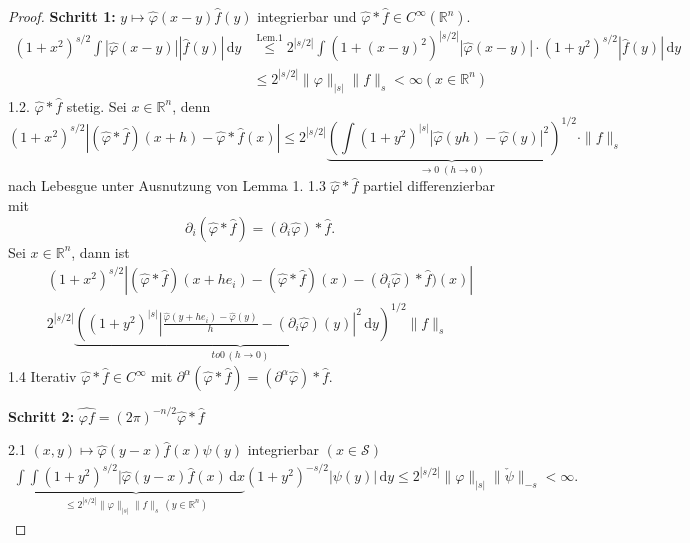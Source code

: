 \documentclass[
paper=a4,
bibtotocnumbered,
liststotocnumbered,
tablecaptionabove,
pointlessnumbers,
twoside,
openright,
10pt
]
{report}
\let\phi\varphi
\theoremstyle{definition}
\numberwithin{equation}{chapter}
\begin{document}
\begin{proof}
\textbf{Schritt 1:} $y\mapsto \hat \phi(x-y) \hat f(y)$ integrierbar und $\hat \phi * \hat f \in C^\infty(\mathbb R^n)$.
\begin{align}
(1+x^2)^{s/2} \int |\hat \phi(x-y)| |\hat f(y)|\, \mathrm dy & \stackrel{\text{Lem.} 1}\le 2^{|s/2|} \int (1+(x-y)^2)^{|s/2|} |\hat \phi(x-y)|\cdot (1+y^2)^{s/2} |\hat f(y)|\, \mathrm dy\\
&\le 2^{|s/2|} \| \phi\|_{|s|} \|f\|_s <\infty (x\in \mathbb R^n)\label{eq:5.1}
\end{align}
1.2. $\hat \phi * \hat f$ stetig. Sei $x\in \mathbb R^n$, denn 
\begin{equation}
(1+x^2)^{s/2} |(\hat \phi * \hat f) (x+h) - \hat \phi * \hat f(x) | \le 2^{|s/2|} \underbrace{\left ( \int (1+y^2)^{|s|} |\hat \phi(yh) - \hat \phi(y)|^2 \right )^{1/2}}_{\to 0\; (h\to 0)} \cdot \| f\|_s
\end{equation}
nach Lebesgue unter Ausnutzung von Lemma 1. %
1.3 $\hat \phi*\hat f$ partiel differenzierbar mit $$\partial_i (\hat \phi * \hat f) = (\partial_i \hat \phi)*\hat f.$$
Sei $x\in \mathbb R^n$, dann ist 
\begin{gather}
(1+x^2)^{s/2} |(\hat \phi * \hat f) (x+h e_i) - (\hat \phi * \hat f)(x) - (\partial_i \hat \phi) * \hat f) (x)|\\
2^{|s/2|} \underbrace{\left ( (1+y^2)^{|s|} \left | \frac{\hat \phi (y+he_i) - \hat \phi(y)}{h} - (\partial_i \hat \phi)(y) \right |^2\, \mathrm dy \right )^{1/2}}_{to 0 \, (h\to 0)}\| f\|_s
\end{gather}
1.4 Iterativ $\hat \phi * \hat f\in C^\infty$ mit $\partial^\alpha(\hat \phi * \hat f) = (\partial^\alpha \hat \phi)*\hat f$.

\textbf{Schritt 2:} $\widehat{\phi f} = (2\pi)^{-n/2} \hat \phi * \hat f$

2.1 $(x,y) \mapsto \hat \phi(y-x) \hat f(x) \psi(y)$ integrierbar $(x\in \mathcal S)$
\begin{gather}
\int \underbrace{\int (1+y^2)^{s/2} |\hat \phi(y-x) \hat f(x)\, \mathrm dx}_{\le 2^{|s/2|} \|\phi\|_{|s|} \|f\|_s \, (y\in \mathbb R^n)} (1+y^2)^{-s/2} |\psi(y)|\, \mathrm dy \le 2^{|s/2|} \| \phi\|_{|s|} \|\check \psi\|_{-s} <\infty.
\end{gather}


\end{proof}
\end{document}
